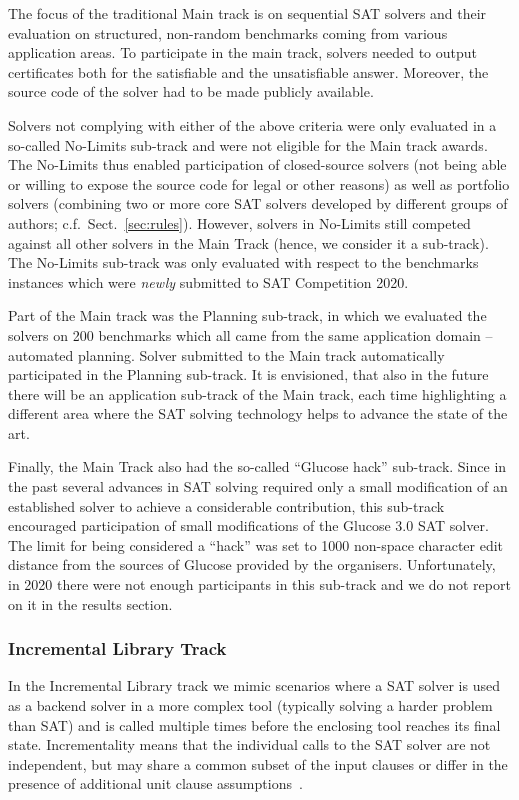 \documentclass{elsarticle}
\begin{document}
The focus of the traditional Main track is on sequential SAT solvers and their evaluation on structured, non-random benchmarks coming from various application areas. To participate in the main track, solvers needed to output certificates both for the satisfiable and the unsatisfiable answer. Moreover, the source code of the solver had to be made publicly available. 

Solvers not complying with either of the above criteria were only evaluated in a so-called No-Limits sub-track and were not eligible for the Main track awards. The No-Limits thus enabled participation of closed-source solvers (not being able or willing to expose the source code for legal or other reasons) as well as portfolio solvers (combining two or more core SAT solvers developed by different groups of authors; c.f.~Sect.~\ref{sec:rules}). However, solvers in No-Limits still competed against all other solvers in the Main Track (hence, we consider it a sub-track). The No-Limits sub-track was only evaluated with respect to the benchmarks instances which were \emph{newly} submitted to SAT Competition 2020.

Part of the Main track was the Planning sub-track, in which we evaluated the solvers on 200 benchmarks 
which all came from the same application domain -- automated planning. 
Solver submitted to the Main track automatically participated in the Planning sub-track.
It is envisioned, that also in the future there will be an application sub-track of the Main track, each time highlighting a different area where the SAT solving technology helps to advance the state of the art.

Finally, the Main Track also had the so-called ``Glucose hack'' sub-track. 
Since in the past several advances in SAT solving required only a small modification of an established solver
to achieve a considerable contribution, this sub-track encouraged participation 
of small modifications of the Glucose 3.0 SAT solver. The limit for being considered a ``hack''
was set to 1000 non-space character edit distance from the sources of Glucose provided by the organisers. 
Unfortunately, in 2020 there were not enough participants in this sub-track and we do not report on it 
in the results section.

\subsubsection{Incremental Library Track}

In the Incremental Library track we mimic scenarios
where a SAT solver is used as a backend solver in a more complex tool
(typically solving a harder problem than SAT) and is called multiple times before 
the enclosing tool reaches its final state. Incrementality means that
the individual calls to the SAT solver are not independent, but may share 
a common subset of the input clauses or differ in the presence of additional 
unit clause assumptions~\cite{Nadel:2014:Incremental,Fazekas:2019:IncrementalInprocessing}. 
\end{document}

